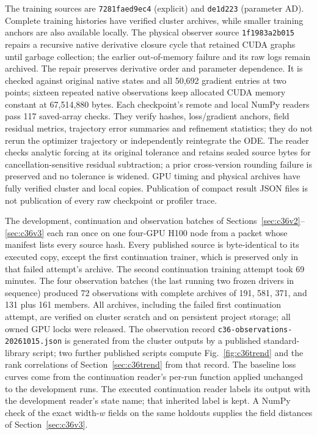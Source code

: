 \documentclass[11pt]{article}
\begin{document}
The training sources are \texttt{7281faed9ec4} (explicit) and
\texttt{de1d223} (parameter AD). Complete training histories have verified
cluster archives, while smaller training anchors are also available
locally. The physical observer source \texttt{1f1983a2b015} repairs a
recursive native derivative closure cycle that retained CUDA graphs until
garbage collection; the earlier out-of-memory failure and its raw logs
remain archived. The repair preserves derivative order and parameter
dependence. It is checked against original native states and all 50,692
gradient entries at two points; sixteen repeated native observations keep
allocated CUDA memory constant at 67,514,880 bytes. Each checkpoint's remote
and local NumPy readers pass 117 saved-array checks. They verify hashes,
loss/gradient anchors, field residual metrics, trajectory error summaries
and refinement statistics; they do not rerun the optimizer trajectory or
independently reintegrate the ODE. The reader checks analytic forcing at
its original tolerance and retains sealed source bytes for
cancellation-sensitive residual subtraction; a prior cross-version rounding
failure is preserved and no tolerance is widened. GPU timing and physical
archives have fully verified cluster and local copies. Publication of
compact result JSON files is not publication of every raw checkpoint or
profiler trace.

The development, continuation and observation batches of
Sections~\ref{sec:c36v2}--\ref{sec:c36v3} each ran once on one four-GPU H100
node from a packet whose manifest lists every source hash. Every published
source is byte-identical to its executed copy, except the first continuation
trainer, which is preserved only in that failed attempt's archive. The
second continuation training attempt took 69 minutes. The four observation
batches (the last running two frozen drivers in sequence) produced 72
observations with complete archives of 191, 581, 371, and 131 plus 161
members. All archives, including the failed first continuation attempt, are
verified on cluster scratch and on persistent project storage; all owned GPU
locks were released. The
observation record \texttt{c36-observations-20261015.json} is generated from
the cluster outputs by a published standard-library script; two further
published scripts compute Fig.~\ref{fig:c36trend} and the rank correlations
of Section~\ref{sec:c36trend} from that record. The baseline loss curves come from the
continuation reader's per-run function applied unchanged to the development
runs. The executed continuation reader labels its output with the
development reader's state name; that inherited label is kept. A NumPy check
of the exact width-$w$ fields on the same holdouts supplies the field
distances of Section~\ref{sec:c36v3}.
\end{document}
